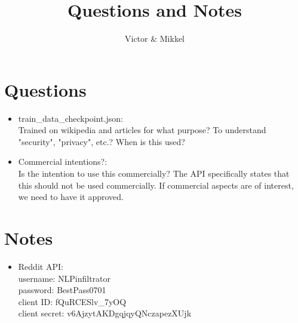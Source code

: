 \documentclass{article}
\begin{document}
\title{Questions and Notes}
\author{Victor \& Mikkel}

\maketitle

\section{Questions}
\begin{itemize}
	\item train\_data\_checkpoint.json:\\
	Trained on wikipedia and articles for what purpose?
	To understand "security", "privacy", etc.?
	When is this used?
	\item Commercial intentions?:\\
	Is the intention to use this commercially? 
	The API specifically states that this should not be used commercially. 
	If commercial aspects are of interest, we need to have it approved.
	

\end{itemize}

\section{Notes}
\begin{itemize}
	\item Reddit API:\\
	username: NLPinfiltrator\\
	password: BestPass0701\\
	client ID: fQuRCESlv\_7yOQ\\
	client secret: v6AjzytAKDgqjqyQNczapezXUjk
\end{itemize}
\end{document}

